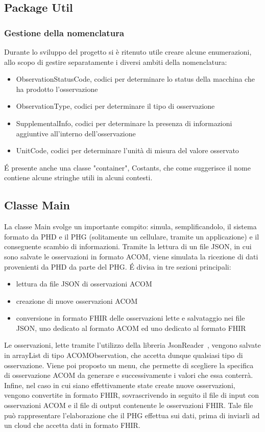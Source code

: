 \documentclass[a4paper]{article}
\begin{document}
\subsection{Package Util}\label{subsec:PackageUtil}
\subsubsection*{Gestione della nomenclatura}
Durante lo sviluppo del progetto si è ritenuto utile creare alcune enumerazioni, allo scopo di gestire separatamente i diversi ambiti della nomenclatura:
\begin{itemize}
    \item ObservationStatusCode, codici per determinare lo status della macchina che ha prodotto l'osservazione
    \item ObservationType, codici per determinare il tipo di osservazione
    \item SupplementalInfo, codici per determinare la presenza di informazioni aggiuntive all'interno dell'osservazione
    \item UnitCode, codici per determinare l'unità di misura del valore osservato
\end{itemize}
\'E presente anche una classe "container", Costants, che come suggerisce il nome contiene alcune stringhe utili in alcuni contesti. 
\subsection{Classe Main}\label{subsec:Main}
La classe Main svolge un importante compito: simula, semplificandolo, il sistema formato da PHD e il PHG (solitamente un cellulare, tramite un applicazione) e il conseguente scambio di informazioni.
Tramite la lettura di un file JSON, in cui sono salvate le osservazioni in formato ACOM, viene simulata la ricezione di dati provenienti da PHD da parte del PHG.
\'E divisa in tre sezioni principali:
\begin{itemize}
    \item lettura da file JSON di osservazioni ACOM
    \item creazione di nuove osservazioni ACOM
    \item conversione in formato FHIR delle osservazioni lette e salvataggio nei file JSON, uno dedicato al formato ACOM ed uno dedicato al formato FHIR
\end{itemize}
Le osservazioni, lette tramite l'utilizzo della libreria JsonReader~\cite{JsonReader}, vengono salvate in arrayList di tipo ACOMObservation, che accetta dunque qualsiasi tipo di osservazione.
Viene poi proposto un menu, che permette di scegliere la specifica di osservazione ACOM da generare e successivamente i valori che essa conterrà.
Infine, nel caso in cui siano effettivamente state create nuove osservazioni, vengono convertite in formato FHIR, sovrascrivendo in seguito il file di input con osservazioni ACOM e il file di output contenente le osservazioni FHIR.
Tale file può rappresentare l'elaborazione che il PHG effettua sui dati, prima di inviarli ad un cloud che accetta dati in formato FHIR.
\end{document}

